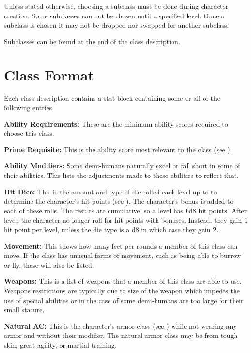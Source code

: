 \begin{multicols*}{2}
Unless stated otherwise, choosing a subclass must be done during character creation. Some subclasses can not be chosen until a specified level. Once a subclass is chosen it may not be dropped nor swapped for another subclass.

Subclasses can be found at the end of the class description.

\section{Class Format}\label{sec:Class Format}
Each class description contains a stat block containing some or all of the following entries.

\textbf{Ability Requirements:} These are the minimum ability scores required to choose this class.

\textbf{Prime Requisite:} This is the ability score most relevant to the class (see ).

\textbf{Ability Modifiers:} Some demi-humans naturally excel or fall short in some of their abilities. This lists the adjustments made to these abilities to reflect that.

\textbf{Hit Dice:} This is the amount and type of die rolled each level up to  to determine the character’s hit points (see ). The character’s  bonus is added to each of these rolls. The results are cumulative, so a  level  has 6d8 hit points. After  level, the character no longer roll for hit points with  bonuses. Instead, they gain 1 hit point per level, unless the die type is a d8 in which case they gain 2.

\textbf{Movement:} This shows how many feet per rounds a member of this class can move. If the class has unusual forms of movement, such as being able to burrow or fly, these will also be listed.

\textbf{Weapons:} This is a list of weapons that a member of this class are able to use. Weapons restrictions are typically due to size of the weapon which impedes the use of special abilities or in the case of some demi-humans are too large for their small stature.

\textbf{Natural AC:} This is the character’s armor class (see ) while not wearing any armor and without their  modifier. The natural armor class may be from tough skin, great agility, or martial training.


\end{multicols*}
